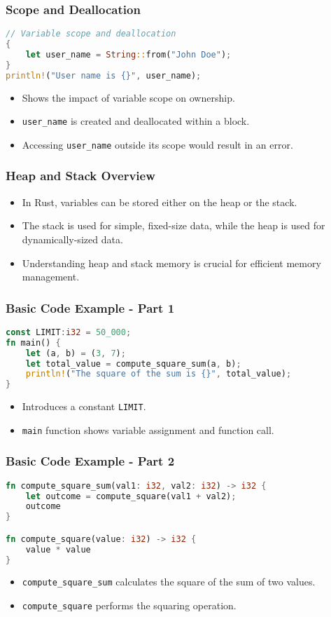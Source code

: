 \documentclass[aspectratio=169, table]{beamer}
\begin{document}
\begin{frame}[fragile]
\frametitle{Scope and Deallocation}
\begin{lstlisting}[language=Rust]
// Variable scope and deallocation
{
	let user_name = String::from("John Doe"); 
} 
println!("User name is {}", user_name); 
\end{lstlisting}
\begin{itemize}
\item Shows the impact of variable scope on ownership.
\item \texttt{user\_name} is created and deallocated within a block.
\item Accessing \texttt{user\_name} outside its scope would result in an error.
\end{itemize}
\end{frame}

\begin{frame}[fragile]
\frametitle{Heap and Stack Overview}
\begin{itemize}
\item In Rust, variables can be stored either on the heap or the stack.
\item The stack is used for simple, fixed-size data, while the heap is used for dynamically-sized data.
\item Understanding heap and stack memory is crucial for efficient memory management.
\end{itemize}
\end{frame}

\begin{frame}[fragile]
\frametitle{Basic Code Example - Part 1}
\begin{lstlisting}[language=Rust]
const LIMIT:i32 = 50_000; 
fn main() {
	let (a, b) = (3, 7); 
	let total_value = compute_square_sum(a, b); 
	println!("The square of the sum is {}", total_value); 
} 
\end{lstlisting}
\begin{itemize}
\item Introduces a constant \texttt{LIMIT}.
\item \texttt{main} function shows variable assignment and function call.
\end{itemize}
\end{frame}

\begin{frame}[fragile]
\frametitle{Basic Code Example - Part 2}
\begin{lstlisting}[language=Rust]
fn compute_square_sum(val1: i32, val2: i32) -> i32 {
	let outcome = compute_square(val1 + val2); 
	outcome
}

fn compute_square(value: i32) -> i32 {
	value * value
}
\end{lstlisting}
\begin{itemize}
\item \texttt{compute\_square\_sum} calculates the square of the sum of two values.
\item \texttt{compute\_square} performs the squaring operation.
\end{itemize}
\end{frame}
\end{document}
